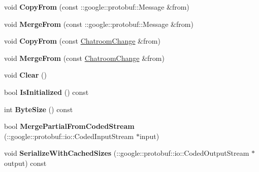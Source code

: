 \begin{DoxyCompactItemize}
\item 
\hypertarget{classSimpleChat_1_1ChatroomChange_ac68b686d1309f3ecd6692c191cb854a9}{void {\bfseries Copy\-From} (const \-::google\-::protobuf\-::\-Message \&from)}\label{classSimpleChat_1_1ChatroomChange_ac68b686d1309f3ecd6692c191cb854a9}

\item 
\hypertarget{classSimpleChat_1_1ChatroomChange_aaf17b68dba7ef7f181c9bb217b822887}{void {\bfseries Merge\-From} (const \-::google\-::protobuf\-::\-Message \&from)}\label{classSimpleChat_1_1ChatroomChange_aaf17b68dba7ef7f181c9bb217b822887}

\item 
\hypertarget{classSimpleChat_1_1ChatroomChange_afb801d7bf6377b7c156a62e229f71c5c}{void {\bfseries Copy\-From} (const \hyperlink{classSimpleChat_1_1ChatroomChange}{Chatroom\-Change} \&from)}\label{classSimpleChat_1_1ChatroomChange_afb801d7bf6377b7c156a62e229f71c5c}

\item 
\hypertarget{classSimpleChat_1_1ChatroomChange_a2a314c25282ce98c6e35061a9251107d}{void {\bfseries Merge\-From} (const \hyperlink{classSimpleChat_1_1ChatroomChange}{Chatroom\-Change} \&from)}\label{classSimpleChat_1_1ChatroomChange_a2a314c25282ce98c6e35061a9251107d}

\item 
\hypertarget{classSimpleChat_1_1ChatroomChange_a15422c7efe2e8d9b9ec4782912b53871}{void {\bfseries Clear} ()}\label{classSimpleChat_1_1ChatroomChange_a15422c7efe2e8d9b9ec4782912b53871}

\item 
\hypertarget{classSimpleChat_1_1ChatroomChange_a0ccbfbeaa74853086743b47c9e51e0bb}{bool {\bfseries Is\-Initialized} () const }\label{classSimpleChat_1_1ChatroomChange_a0ccbfbeaa74853086743b47c9e51e0bb}

\item 
\hypertarget{classSimpleChat_1_1ChatroomChange_afb166debf92f4dfaeb0d65f6fdd8072b}{int {\bfseries Byte\-Size} () const }\label{classSimpleChat_1_1ChatroomChange_afb166debf92f4dfaeb0d65f6fdd8072b}

\item 
\hypertarget{classSimpleChat_1_1ChatroomChange_aa9437c9c14d96c00433739014292dbd6}{bool {\bfseries Merge\-Partial\-From\-Coded\-Stream} (\-::google\-::protobuf\-::io\-::\-Coded\-Input\-Stream $\ast$input)}\label{classSimpleChat_1_1ChatroomChange_aa9437c9c14d96c00433739014292dbd6}

\item 
\hypertarget{classSimpleChat_1_1ChatroomChange_ab401eaeaae01c66c4792748817cfbc5b}{void {\bfseries Serialize\-With\-Cached\-Sizes} (\-::google\-::protobuf\-::io\-::\-Coded\-Output\-Stream $\ast$output) const }\label{classSimpleChat_1_1ChatroomChange_ab401eaeaae01c66c4792748817cfbc5b}


\end{DoxyCompactItemize}
